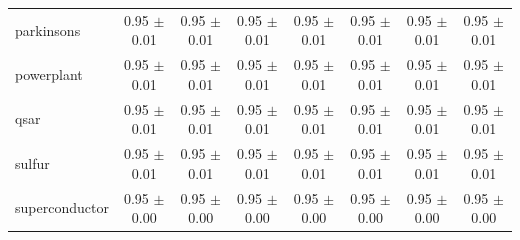 \begin{table}[!htbp]
{\begin{tabular}{lccccccc}
parkinsons & 0.95 $\pm$ 0.01 & 0.95 $\pm$ 0.01 & 0.95 $\pm$ 0.01 & 0.95 $\pm$ 0.01 & 0.95 $\pm$ 0.01 & 0.95 $\pm$ 0.01 & 0.95 $\pm$ 0.01 \\
powerplant & 0.95 $\pm$ 0.01 & 0.95 $\pm$ 0.01 & 0.95 $\pm$ 0.01 & 0.95 $\pm$ 0.01 & 0.95 $\pm$ 0.01 & 0.95 $\pm$ 0.01 & 0.95 $\pm$ 0.01 \\
qsar & 0.95 $\pm$ 0.01 & 0.95 $\pm$ 0.01 & 0.95 $\pm$ 0.01 & 0.95 $\pm$ 0.01 & 0.95 $\pm$ 0.01 & 0.95 $\pm$ 0.01 & 0.95 $\pm$ 0.01 \\
sulfur & 0.95 $\pm$ 0.01 & 0.95 $\pm$ 0.01 & 0.95 $\pm$ 0.01 & 0.95 $\pm$ 0.01 & 0.95 $\pm$ 0.01 & 0.95 $\pm$ 0.01 & 0.95 $\pm$ 0.01 \\
superconductor & 0.95 $\pm$ 0.00 & 0.95 $\pm$ 0.00 & 0.95 $\pm$ 0.00 & 0.95 $\pm$ 0.00 & 0.95 $\pm$ 0.00 & 0.95 $\pm$ 0.00 & 0.95 $\pm$ 0.00 \\
\bottomrule
\end{tabular}
}
\end{table}